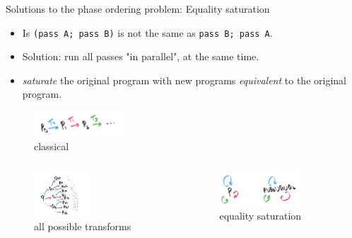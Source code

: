 \documentclass[8pt]{beamer}
\begin{document}
\begin{frame}[fragile]{Solutions to the phase ordering problem: Equality saturation}
\begin{itemize}
\item Is \texttt{(pass A; pass B)} is not the same as \texttt{pass B; pass A}.
\item Solution: run all passes "in parallel", at the same time. \pause
\item \emph{saturate} the original program with new programs
      \emph{equivalent} to the original program.
\end{itemize}

\pause
\begin{figure}
\includegraphics[width=0.3\textwidth]{./transform-old.png}
\caption{classical}
\end{figure}
\pause

\begin{columns}
\begin{column}{.48\textwidth}
\begin{figure}
\includegraphics[width=0.5\textwidth]{./transform-new.png}
\caption{all possible transforms}
\end{figure}
\end{column}
\pause
\begin{column}{.48\textwidth}
\begin{figure}
\includegraphics[width=0.7\textwidth]{./transform-eqsat.png}
\caption{equality saturation}
\end{figure}
\end{column}
\end{columns}

\end{frame}
\end{document}

